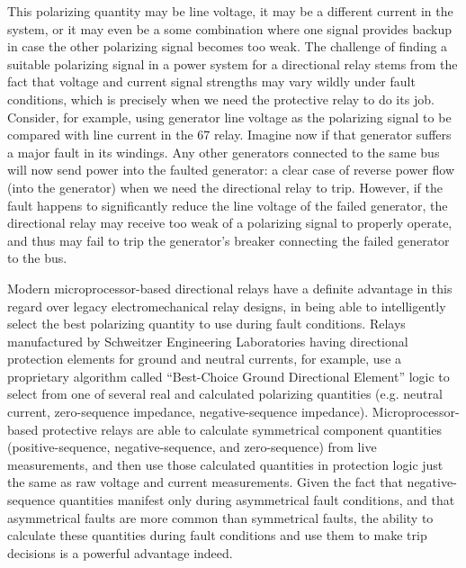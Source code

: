 This polarizing quantity may be line voltage, it may be a different current in the system, or it may even be a some combination where one signal provides backup in case the other polarizing signal becomes too weak.  The challenge of finding a suitable polarizing signal in a power system for a directional relay stems from the fact that voltage and current signal strengths may vary wildly under fault conditions, which is precisely when we need the protective relay to do its job.  Consider, for example, using generator line voltage as the polarizing signal to be compared with line current in the 67 relay.  Imagine now if that generator suffers a major fault in its windings.  Any other generators connected to the same bus will now send power into the faulted generator: a clear case of reverse power flow (into the generator) when we need the directional relay to trip.  However, if the fault happens to significantly reduce the line voltage of the failed generator, the directional relay may receive too weak of a polarizing signal to properly operate, and thus may fail to trip the generator's breaker connecting the failed generator to the bus.

Modern microprocessor-based directional relays have a definite advantage in this regard over legacy electromechanical relay designs, in being able to intelligently select the best polarizing quantity to use during fault conditions.  Relays manufactured by Schweitzer Engineering Laboratories having directional protection elements for ground and neutral currents, for example, use a proprietary algorithm called ``Best-Choice Ground Directional Element'' logic to select from one of several real and calculated polarizing quantities (e.g. neutral current, zero-sequence impedance, negative-sequence impedance).  Microprocessor-based protective relays are able to calculate symmetrical component quantities (positive-sequence, negative-sequence, and zero-sequence) from live measurements, and then use those calculated quantities in protection logic just the same as raw voltage and current measurements.  Given the fact that negative-sequence quantities manifest only during asymmetrical fault conditions, and that asymmetrical faults are more common than symmetrical faults, the ability to calculate these quantities during fault conditions and use them to make trip decisions is a powerful advantage indeed.   










